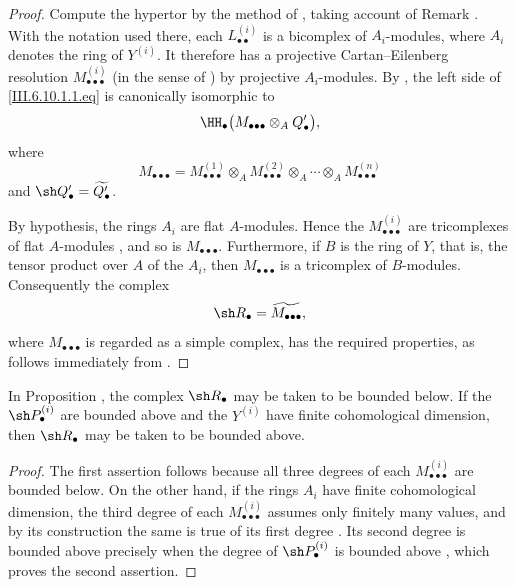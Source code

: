 \begin{proof}
Compute the hypertor by the method of , taking
account of Remark .  With the notation used
there, each $L_{\bullet\bullet}^{(i)}$ is a bicomplex of
$A_i$-modules, where $A_i$ denotes the ring of $Y^{(i)}$.
It therefore has a projective Cartan--Eilenberg resolution
$M_{\bullet\bullet\bullet}^{(i)}$ (in the sense of
) by projective $A_i$-modules.  By
, the left side of
\eqref{III.6.10.1.1.eq} is canonically isomorphic to
\[
  \HH_\bullet
  \bigl(
    M_{\bullet\bullet\bullet}\otimes_AQ_\bullet'
  \bigr),
\]
where
\[
  M_{\bullet\bullet\bullet}
  =
  M_{\bullet\bullet\bullet}^{(1)}
  \otimes_A
  M_{\bullet\bullet\bullet}^{(2)}
  \otimes_A\cdots\otimes_A
  M_{\bullet\bullet\bullet}^{(n)}
\]
and $\sh Q_\bullet'=\widetilde{Q_\bullet'}$.

By hypothesis, the rings $A_i$ are flat $A$-modules.  Hence the
$M_{\bullet\bullet\bullet}^{(i)}$ are tricomplexes of flat
$A$-modules , and so is
$M_{\bullet\bullet\bullet}$.  Furthermore, if $B$ is the ring of
$Y$, that is, the tensor product over $A$ of the $A_i$, then
$M_{\bullet\bullet\bullet}$ is a tricomplex of $B$-modules.
Consequently the complex
\[
  \sh R_\bullet
  =
  \widetilde{M_{\bullet\bullet\bullet}},
\]
where $M_{\bullet\bullet\bullet}$ is regarded as a simple
complex, has the required properties, as follows immediately
from .
\end{proof}

\begin{corollary}[6.10.2]
\label{III.6.10.2}
In Proposition , the complex
$\sh R_\bullet$ may be taken to be bounded below.  If the
$\sh P_\bullet^{(i)}$ are bounded above and the $Y^{(i)}$ have
finite cohomological dimension, then $\sh R_\bullet$ may be
taken to be bounded above.
\end{corollary}

\begin{proof}
The first assertion follows because all three degrees of each
$M_{\bullet\bullet\bullet}^{(i)}$ are bounded below.  On the
other hand, if the rings $A_i$ have finite cohomological
dimension, the third degree of each
$M_{\bullet\bullet\bullet}^{(i)}$ assumes only finitely many
values, and by its construction the same is true of its first
degree .  Its second degree is bounded above
precisely when the degree of $\sh P_\bullet^{(i)}$ is bounded
above , which proves the second assertion.
\end{proof}


